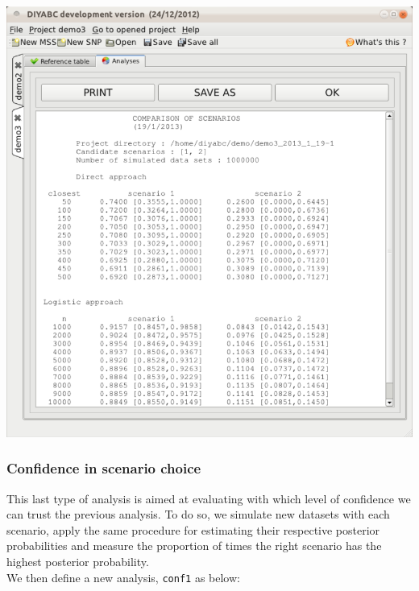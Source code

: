  \includegraphics[scale=0.3]{gui_pictures/Capture-DIYABC-112.png} \\

\subsubsection{Confidence in scenario choice}

This last type of analysis is aimed at evaluating with which level of confidence we can trust the previous analysis. To do so, we simulate new datasets with each scenario, apply the same procedure for estimating their respective posterior probabilities and measure the proportion of times the right scenario has the highest posterior probability.\\
We then define a new analysis, \texttt{conf1} as below:\\   

